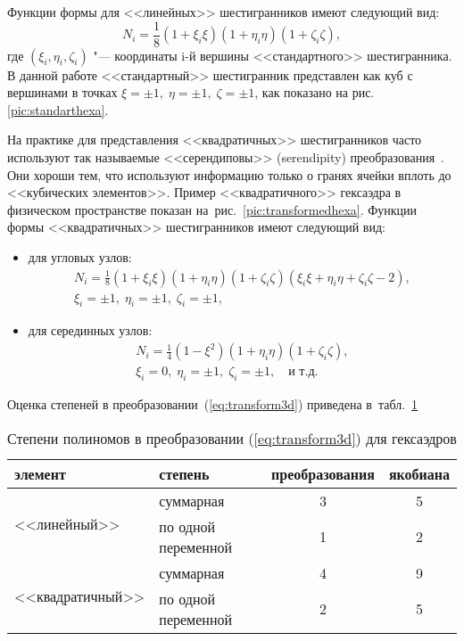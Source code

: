 Функции формы для <<линейных>> шестигранников имеют следующий вид:
\begin{equation}\label{eq:tr:hexa:lin}
N_i = \frac{1}{8} (1 + \xi_i \xi) (1 + \eta_i \eta) (1 + \zeta_i \zeta),
\end{equation}
где \((\xi_i, \eta_i, \zeta_i)\) "--- координаты i-й вершины <<стандартного>> шестигранника. В данной работе <<стандартный>> шестигранник представлен как куб с вершинами в точках \( \xi = \pm 1,\;\eta = \pm 1,\;\zeta = \pm 1\), как показано на рис. \ref{pic:standarthexa}.

На практике для представления <<квадратичных>> шестигранников часто используют так называемые <<серендиповы>> (serendipity) преобразования~\cite{Zienkiewicz:2000:en}. Они хороши тем, что используют информацию только о гранях ячейки вплоть до <<кубических элементов>>. Пример <<квадратичного>> гексаэдра в физическом пространстве показан на~рис.~\ref{pic:transformedhexa}. Функции формы <<квадратичных>> шестигранников имеют следующий вид:
\begin{itemize}
	\item для угловых узлов:
	\begin{multline}\label{eq:tr:hexa:quad}
	N_i = \frac{1}{8} (1 + \xi_i \xi) (1 + \eta_i \eta) (1 + \zeta_i \zeta)(\xi_i \xi + \eta_i \eta + \zeta_i \zeta - 2), \\
	\xi_i = \pm 1,\; \eta_i = \pm 1,\; \zeta_i = \pm 1,
	\end{multline}
	\item для серединных узлов:
	\begin{multline*}
	N_i = \frac{1}{4} (1 - \xi^2) (1 + \eta_i \eta) (1 + \zeta_i \zeta), \\
	\xi_i = 0,\; \eta_i = \pm 1,\; \zeta_i = \pm 1,\quad \text{и т.д.}
	\end{multline*}
\end{itemize}

Оценка степеней в преобразовании~(\ref{eq:transform3d}) приведена в~табл.~\ref{tab:transformorder:hexa}

\begin{table}[ht]
	\centering
	\caption{Степени полиномов в преобразовании (\ref{eq:transform3d}) для гексаэдров}
	\label{tab:transformorder:hexa}
	\smallskip
	\begin{tabular}{l l c c}
		\toprule
		элемент                           & степень             & преобразования & якобиана \\
		\midrule
		\multirow{2}{*}{<<линейный>>}     & суммарная           & 3              & 5 \\
		                                  & по одной переменной & 1              & 2 \\
		\midrule
		\multirow{2}{*}{<<квадратичный>>} & суммарная           & 4              & 9 \\
                                      & по одной переменной & 2              & 5 \\
		\bottomrule
	\end{tabular}
\end{table}



